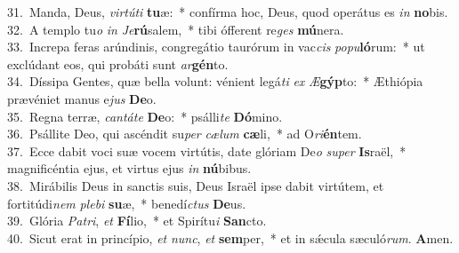 {31.~}Manda, Deus, \textit{vir}\textit{tú}\textit{ti} \textbf{tu}æ:~* confírma hoc, Deus, quod operátus es \textit{in} \textbf{no}bis.\\
{32.~}A templo tu\textit{o} \textit{in} \textit{Je}\textbf{rú}salem,~* tibi ófferent re\textit{ges} \textbf{mú}nera.\\
{33.~}Increpa feras arúndinis, congregátio taurórum in vac\textit{cis} \textit{po}\textit{pu}\textbf{ló}rum:~* ut exclúdant eos, qui probáti sunt \textit{ar}\textbf{gén}to.\\
{34.~}Díssipa Gentes, quæ bella volunt: vénient legá\textit{ti} \textit{ex} \textit{Æ}\textbf{gýp}to:~* Æthiópia prævéniet manus e\textit{jus} \textbf{De}o.\\
{35.~}Regna terræ, \textit{can}\textit{tá}\textit{te} \textbf{De}o:~* psálli\textit{te} \textbf{Dó}mino.\\
{36.~}Psállite Deo, qui ascéndit su\textit{per} \textit{cæ}\textit{lum} \textbf{cæ}li,~* ad O\textit{ri}\textbf{én}tem.\\
{37.~}Ecce dabit voci suæ vocem virtútis, date glóriam De\textit{o} \textit{su}\textit{per} \textbf{Is}raël,~* magnificéntia ejus, et virtus ejus \textit{in} \textbf{nú}bibus.\\
{38.~}Mirábilis Deus in sanctis suis, Deus Israël ipse dabit virtútem, et fortitúdi\textit{nem} \textit{ple}\textit{bi} \textbf{su}æ,~* benedí\textit{ctus} \textbf{De}us.\\
{39.~}Glória \textit{Pa}\textit{tri}, \textit{et} \textbf{Fí}lio,~* et Spirítu\textit{i} \textbf{San}cto.\\
{40.~}Sicut erat in princípio, \textit{et} \textit{nunc}, \textit{et} \textbf{sem}per,~* et in sǽcula sæculó\textit{rum}. \textbf{A}men.\\
